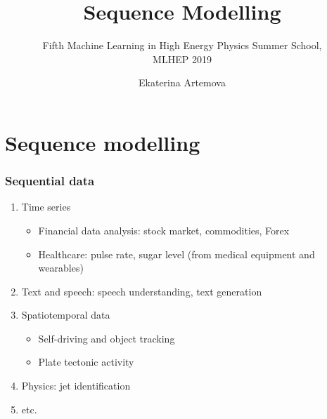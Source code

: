 \documentclass[usenames,dvipsnames,handout,aspectratio=169]{beamer}
\title{Sequence Modelling}
\subtitle{Fifth Machine Learning in High Energy Physics Summer School,\\
MLHEP 2019}
\author[Ekaterina Artemova]{
  Ekaterina Artemova
}
\institute{
	\begin{tabular}{c c}
		National~Research~University~Higher~School~of~Economics
	\end{tabular}
}
\begin{document}




\begin{frame}[plain]
\titlepage
\end{frame}

\begin{frame}[plain]
\tableofcontents
\end{frame}

\section{Sequence modelling}

\begin{frame}
\frametitle{Sequential data}

\begin{enumerate}
	\item Time series
	\begin{itemize}
	\item Financial data analysis: stock market, commodities, Forex
	\item Healthcare: pulse rate, sugar level (from medical equipment and wearables) 
	\end{itemize}
	\item Text and speech: speech understanding, text generation
	\item Spatiotemporal data
	\begin{itemize}
	\item Self-driving and object tracking
	\item Plate tectonic activity
	\end{itemize}
	\item Physics: jet identification
	\item etc.
\end{enumerate}

\end{frame}
\end{document}
